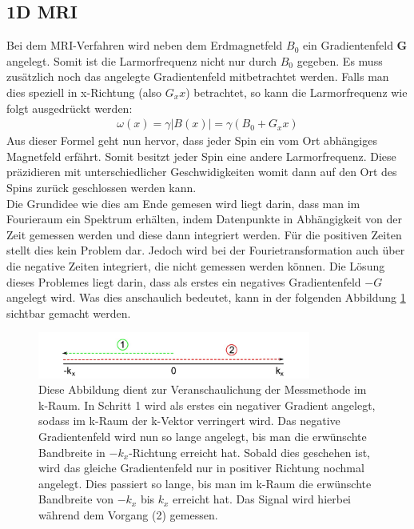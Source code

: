 \subsection{1D MRI}
\label{sec:1DMRIkapitel}
Bei dem MRI-Verfahren wird neben dem Erdmagnetfeld $B_0$ ein Gradientenfeld \textbf{G} angelegt.
Somit ist die Larmorfrequenz nicht nur durch $B_0$ gegeben.
Es muss zusätzlich noch das angelegte Gradientenfeld mitbetrachtet werden.
Falls man dies speziell in x-Richtung (also $G_xx$) betrachtet, so kann die Larmorfrequenz wie folgt ausgedrückt werden:
\begin{align}
    \omega(x)=\gamma |B(x)|= \gamma \left(B_0+G_xx\right) \label{eq:gradientlarmor}
\end{align}
Aus dieser Formel geht nun hervor, dass jeder Spin ein vom Ort abhängiges Magnetfeld erfährt.
Somit besitzt jeder Spin eine andere Larmorfrequenz.
Diese präzidieren mit unterschiedlicher Geschwidigkeiten womit dann auf den Ort des Spins zurück geschlossen werden kann. \\

Die Grundidee wie dies am Ende gemesen wird liegt darin, dass man im Fourieraum ein Spektrum erhälten, indem Datenpunkte in Abhängigkeit von der Zeit gemessen werden und diese dann integriert werden.
Für die positiven Zeiten stellt dies kein Problem dar.
Jedoch wird bei der Fourietransformation auch über die negative Zeiten integriert, die nicht gemessen werden können.
Die Lösung dieses Problemes liegt darin, dass als erstes ein negatives Gradientenfeld $-G$ angelegt wird.
Was dies anschaulich bedeutet, kann in der folgenden Abbildung \ref{fig:1DMRI} sichtbar gemacht werden.  
\begin{figure}[H]
    \centering
    \includegraphics[width=0.8\textwidth]{Abbildungen/1DMRIkraum.JPG}
    \caption{Diese Abbildung dient zur Veranschaulichung der Messmethode im k-Raum.
    In Schritt 1 wird als erstes ein negativer Gradient angelegt, sodass im k-Raum der k-Vektor verringert wird.
    Das negative Gradientenfeld wird nun so lange angelegt, bis man die erwünschte Bandbreite in $-k_{x}$-Richtung erreicht hat.
    Sobald dies geschehen ist, wird das gleiche Gradientenfeld nur in positiver Richtung nochmal angelegt.
    Dies passiert so lange,  bis man im k-Raum die erwünschte Bandbreite von $-k_{x}$ bis $k_{x}$ erreicht hat.
    Das Signal wird hierbei während dem Vorgang (2) gemessen.\cite{Schmidt}}
    \label{fig:1DMRI}
\end{figure}

